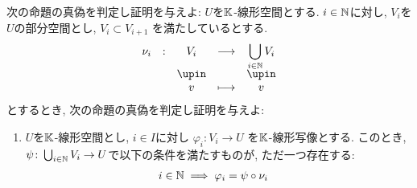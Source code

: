 \begin{quiz}
  次の命題の真偽を判定し証明を与えよ:
  $U$を$\mathbb{K}$-線形空間とする.
  $i\in \mathbb{N}$に対し,
  $V_i$を$U$の部分空間とし,
  $V_{i}\subset V_{i+1}$
  を満たしているとする.
  \begin{align*}
    \shazo{\nu_i}{V_i}{\bigcup_{i\in \NN}V_i}
    {v}{v}
  \end{align*}
  とするとき,
  次の命題の真偽を判定し証明を与えよ:
  \begin{enumerate}
  \item
    $U$を$\mathbb{K}$-線形空間とし,
    $i\in I$に対し
    $\varphi_i\colon  V_i \to U$
    を$\mathbb{K}$-線形写像とする.
    このとき,
    $\psi\colon \bigcup_{i\in \mathbb{N}} V_i\to U$で以下の条件を満たすものが,
    ただ一つ存在する:
    \begin{align*}
      i\in \mathbb{N}\implies \varphi_i&=\psi\circ\nu_i
    \end{align*}
  \end{enumerate}
\end{quiz}





